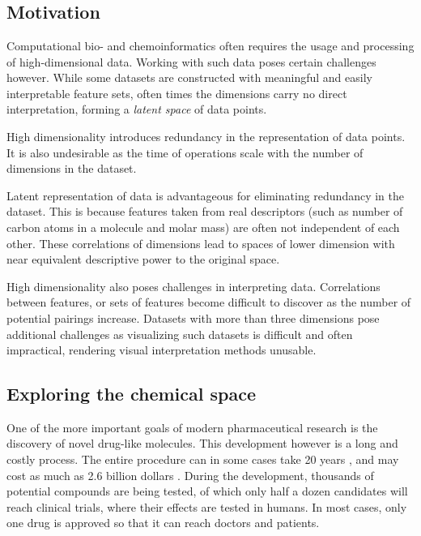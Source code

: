 \chapter{\bevezetes}\label{ch:introduction}

\section{Motivation}\label{sec:motivation}

Computational bio- and chemoinformatics often requires the usage and processing of high-dimensional data. Working with such data poses certain challenges however. While some datasets are constructed with meaningful and easily interpretable feature sets, often times the dimensions carry no direct interpretation, forming a \textit{latent space} of data points.

High dimensionality introduces redundancy in the representation of data points. It is also undesirable as the time of operations scale with the number of dimensions in the dataset.

Latent representation of data is advantageous for eliminating redundancy in the dataset. This is because features taken from real descriptors (such as number of carbon atoms in a molecule and molar mass) are often not independent of each other. These correlations of dimensions lead to spaces of lower dimension with near equivalent descriptive power to the original space. 

High dimensionality also poses challenges in interpreting data. Correlations between features, or sets of features become difficult to discover as the number of potential pairings increase. Datasets with more than three dimensions pose additional challenges as visualizing such datasets is difficult and often impractical, rendering visual interpretation methods unusable.

\section{Exploring the chemical space}\label{sec:exploring-the-chemical-space}

One of the more important goals of modern pharmaceutical research is the discovery of novel drug-like molecules. This development however is a long and costly process. The entire procedure can in some cases take 20 years \cite{bib:rndprod}, and may cost as much as 2.6 billion dollars \cite{bib:2.6billion}. During the development, thousands of potential compounds are being tested, of which only half a dozen candidates will reach clinical trials, where their effects are tested in humans. In most cases, only one drug is approved so that it can reach doctors and patients.

